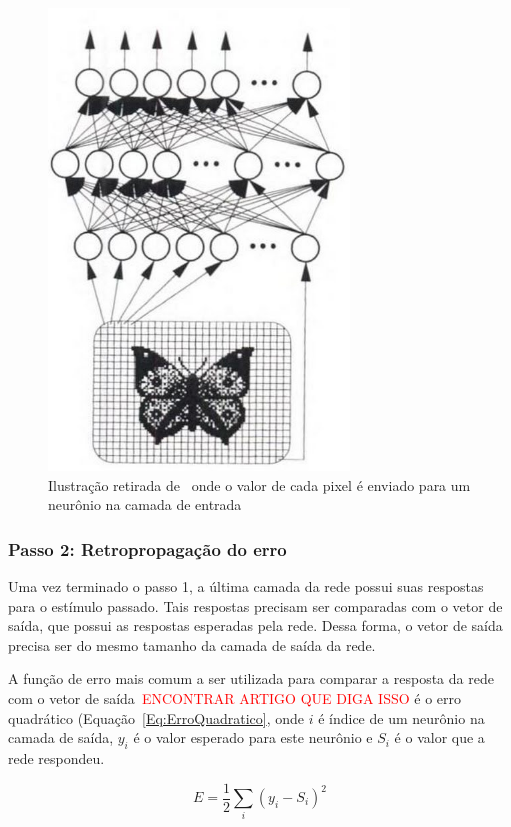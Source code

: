\begin{figure}
\centering
\includegraphics[scale=1]{images/skapura1996building.png}
\caption{Ilustração retirada de~\cite{LIVRO:1996.skapura1996building} onde o valor de cada pixel é enviado para um neurônio na camada de entrada}
\label{Fig:skapura1996building}
\end{figure}

\subsubsection{Passo 2: Retropropagação do erro}

Uma vez terminado o passo 1, a última camada da rede possui suas respostas para o estímulo passado. Tais respostas precisam ser comparadas com o vetor de saída, que possui as respostas esperadas pela rede. Dessa forma, o vetor de saída precisa ser do mesmo tamanho da camada de saída da rede.

A função de erro mais comum a ser utilizada para comparar a resposta da rede com o vetor de saída~\textcolor{red}{ENCONTRAR ARTIGO QUE DIGA ISSO} é o erro quadrático (Equação~\ref{Eq:ErroQuadratico}, onde $i$ é índice de um neurônio na camada de saída, $y_i$ é o valor esperado para este neurônio e $S_i$ é o valor que a rede respondeu.

\begin{equation}
E = \frac{1}{2} \sum_i (y_i - S_i)^2
\label{Eq:ErroQuadratico}
\end{equation}

